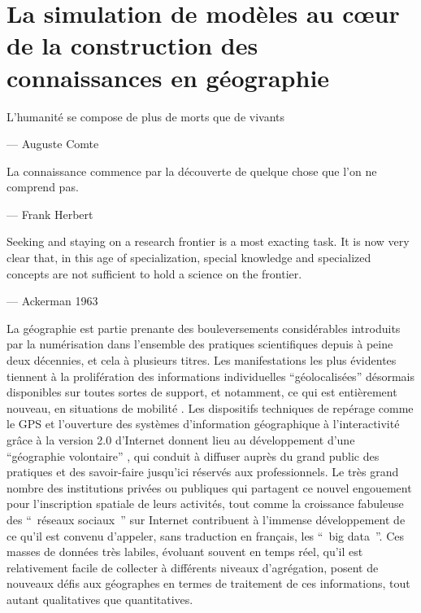 \graphicspath{{FigureIntroduction/}}

\chapter{La simulation de modèles au cœur de la construction des connaissances en géographie}

\startcontents[chapters]
\Mprintcontents


\epigraph {L'humanité se compose de plus de morts que de vivants } { --- \textup{Auguste Comte}}

\epigraph {La connaissance commence par la découverte de quelque chose que l'on ne comprend pas.  } { --- \textup{Frank Herbert}}

\epigraph {Seeking and staying on a research frontier is a most exacting task. It is now very clear that, in this age of specialization, special knowledge and specialized concepts are not sufficient to hold a science on the frontier.}{ --- \textup{Ackerman 1963}}


La géographie est partie prenante des bouleversements considérables introduits par la numérisation dans l’ensemble des pratiques scientifiques depuis à peine deux décennies, et cela à plusieurs titres. Les manifestations les plus évidentes tiennent à la prolifération des informations individuelles \enquote{géolocalisées} désormais disponibles sur toutes sortes de support, et notamment, ce qui est entièrement nouveau, en situations de mobilité \autocite{FenChong2012}. Les dispositifs techniques de repérage comme le GPS et l’ouverture des systèmes d’information géographique à l’interactivité grâce à la version 2.0 d’Internet donnent lieu au développement d’une \enquote{géographie volontaire} \autocite{Goodchild2007}, qui conduit à diffuser auprès du grand public des pratiques et des savoir-faire jusqu’ici réservés aux professionnels. Le très grand nombre des institutions privées ou publiques qui partagent ce nouvel engouement pour l’inscription spatiale de leurs activités, tout comme la croissance fabuleuse des \enquote{ réseaux sociaux } sur Internet  contribuent à l’immense développement de ce qu’il est convenu d’appeler, sans traduction en français, les \enquote{ big data }. Ces masses de données très labiles, évoluant souvent en temps réel, qu’il est relativement facile de collecter à différents niveaux d’agrégation, posent de nouveaux défis aux géographes en termes de traitement de ces informations, tout autant qualitatives que quantitatives. 

